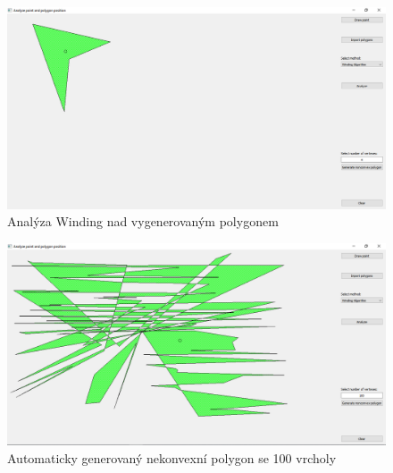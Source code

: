 \documentclass[a4paper,11pt,twoside]{article}
\begin{document}
\vspace{0.2cm}
\begin{figure}[hbt!] 
\begin{center}
\includegraphics[width=15cm]{pictures/windingongenerated.png} 
\caption[Analýza Winding nad vygenerovaným polygonem]{Analýza Winding nad vygenerovaným polygonem}
\label{fig:windingongenerated}
\end{center}
\end{figure}

\vspace{0.2cm}
\begin{figure}[hbt!] 
\begin{center}
\includegraphics[width=15cm]{pictures/100vertexes.png} 
\caption[Automaticky generovaný nekonvexní polygon se 100 vrcholy]{Automaticky generovaný nekonvexní polygon se 100 vrcholy}
\label{fig:100vertexes}
\end{center}
\end{figure}
\end{document}
